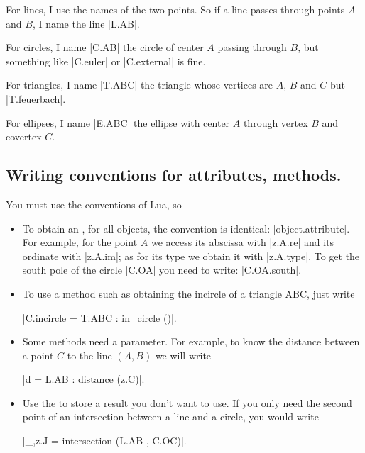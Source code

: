 For lines, I use the names of the two points. So if a line passes through points $A$ and $B$, I name the line |L.AB|. 

For circles, I name |C.AB| the circle of center $A$ passing through $B$, but something like |C.euler| or |C.external| is fine.

For triangles, I name |T.ABC| the triangle whose vertices are $A$, $B$ and $C$ but |T.feuerbach|.

For ellipses, I name |E.ABC| the ellipse with center $A$ through vertex $B$ and covertex $C$.

\subsection{Writing conventions for attributes, methods.} %
\label{sub:writing_conventions_for_attributes_methods_and_functions}

You must use the conventions of Lua, so

\begin{itemize}
   \item To obtain an , for all objects, the convention is identical: |object.attribute|. For example, for the point $A$ we access its abscissa with |z.A.re| and its ordinate with |z.A.im|; as for its type we obtain it with |z.A.type|. To get the south pole of the circle |C.OA| you need to write: |C.OA.south|.
   
   \item To use a method such as obtaining the incircle of a triangle ABC, just write  
   
   |C.incircle = T.ABC : in_circle ()|. 
   
   \item Some methods need a parameter. For example, to know the distance between a point  $C$  to the line $(A,B)$ we will write 
   
   |d = L.AB : distance (z.C)|.
   
   \item Use the  to store a result you don't want to use. If you only need the second point of an intersection between a line and a circle, you would write 
   
   |_,z.J = intersection (L.AB , C.OC)|.

\end{itemize}
\endinput
